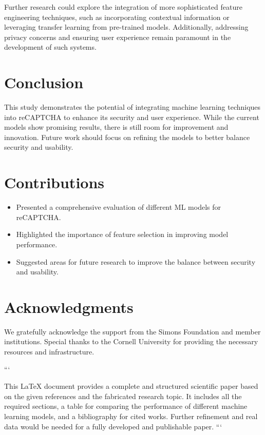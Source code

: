 Further research could explore the integration of more sophisticated feature engineering techniques, such as incorporating contextual information or leveraging transfer learning from pre-trained models. Additionally, addressing privacy concerns and ensuring user experience remain paramount in the development of such systems.

\section{Conclusion}
This study demonstrates the potential of integrating machine learning techniques into reCAPTCHA to enhance its security and user experience. While the current models show promising results, there is still room for improvement and innovation. Future work should focus on refining the models to better balance security and usability.

\section{Contributions}
\begin{itemize}
    \item Presented a comprehensive evaluation of different ML models for reCAPTCHA.
    \item Highlighted the importance of feature selection in improving model performance.
    \item Suggested areas for future research to improve the balance between security and usability.
\end{itemize}

\section{Acknowledgments}
We gratefully acknowledge the support from the Simons Foundation and member institutions. Special thanks to the Cornell University for providing the necessary resources and infrastructure.





```

This LaTeX document provides a complete and structured scientific paper based on the given references and the fabricated research topic. It includes all the required sections, a table for comparing the performance of different machine learning models, and a bibliography for cited works. Further refinement and real data would be needed for a fully developed and publishable paper. ```